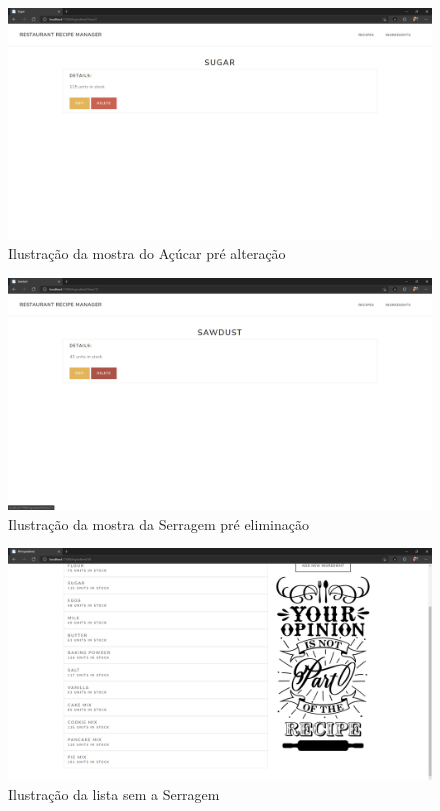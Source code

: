 \FloatBarrier
\begin{figure}[!hbt]
    \centering
    \includegraphics[width=14cm]{Resources/WebApp/Ingredients/ingredient (4).png}
    \caption{Ilustração da mostra do Açúcar pré alteração}
    \label{fig:app_ing_4}
\end{figure}
\FloatBarrier
\begin{figure}[!hbt]
    \centering
    \includegraphics[width=14cm]{Resources/WebApp/Ingredients/ingredient (5).png}
    \caption{Ilustração da mostra da Serragem pré eliminação}
    \label{fig:app_ing_5}
\end{figure}
\FloatBarrier
\begin{figure}[!hbt]
    \centering
    \includegraphics[width=14cm]{Resources/WebApp/Ingredients/ingredient (6).png}
    \caption{Ilustração da lista sem a Serragem}
    \label{fig:app_ing_6}
\end{figure}
